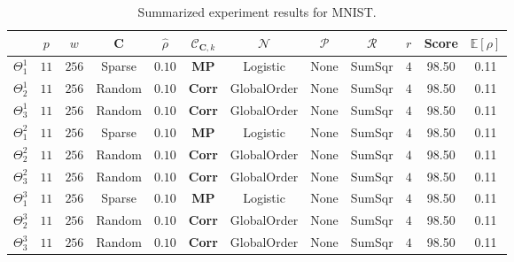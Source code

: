\documentclass[12pt,a4paper,oneside,english]{UPBThesis}
\begin{document}
\renewcommand{\arraystretch}{1.2}
\begin{table}
  \caption{Summarized experiment results for MNIST.}
  \label{table:RecoderEvMNISTResultsSummarized}
  \begin{tabularx}{\textwidth}{|R|c|c|c|c|c|c|c|c|c|c|c|}
    \hline
    & $p$ & $w$ & $\textbf{C}$ & $\hat{\rho}$ & $\mathcal{C}_{\textbf{C},k}$ & $\mathcal{N}$ & $\mathcal{P}$ & $\mathcal{R}$ & $r$ & Score & $\mathbb{E}[\rho]$ \tabularnewline\hline\hline
    $\Theta_1^1$ & $11$ & $256$ & Sparse & $0.10$ & \textbf{MP} & Logistic & None & SumSqr & $4$ & 98.50 & 0.11 \tabularnewline\hline
    $\Theta_2^1$ & $11$ & $256$ & Random & $0.10$ & \textbf{Corr} & GlobalOrder & None & SumSqr & $4$ & 98.50 & 0.11 \tabularnewline\hline
    $\Theta_3^1$ & $11$ & $256$ & Random & $0.10$ & \textbf{Corr} & GlobalOrder & None & SumSqr & $4$ & 98.50 & 0.11 \tabularnewline\hline\hline
    $\Theta_1^2$ & $11$ & $256$ & Sparse & $0.10$ & \textbf{MP} & Logistic & None & SumSqr & $4$ & 98.50 & 0.11 \tabularnewline\hline
    $\Theta_2^2$ & $11$ & $256$ & Random & $0.10$ & \textbf{Corr} & GlobalOrder & None & SumSqr & $4$ & 98.50 & 0.11 \tabularnewline\hline
    $\Theta_3^2$ & $11$ & $256$ & Random & $0.10$ & \textbf{Corr} & GlobalOrder & None & SumSqr & $4$ & 98.50 & 0.11 \tabularnewline\hline\hline
    $\Theta_1^3$ & $11$ & $256$ & Sparse & $0.10$ & \textbf{MP} & Logistic & None & SumSqr & $4$ & 98.50 & 0.11 \tabularnewline\hline
    $\Theta_2^3$ & $11$ & $256$ & Random & $0.10$ & \textbf{Corr} & GlobalOrder & None & SumSqr & $4$ & 98.50 & 0.11 \tabularnewline\hline
    $\Theta_3^3$ & $11$ & $256$ & Random & $0.10$ & \textbf{Corr} & GlobalOrder & None & SumSqr & $4$ & 98.50 & 0.11 \tabularnewline
    \hline
  \end{tabularx}
\end{table}
\renewcommand{\arraystretch}{1.0}
\end{document}
